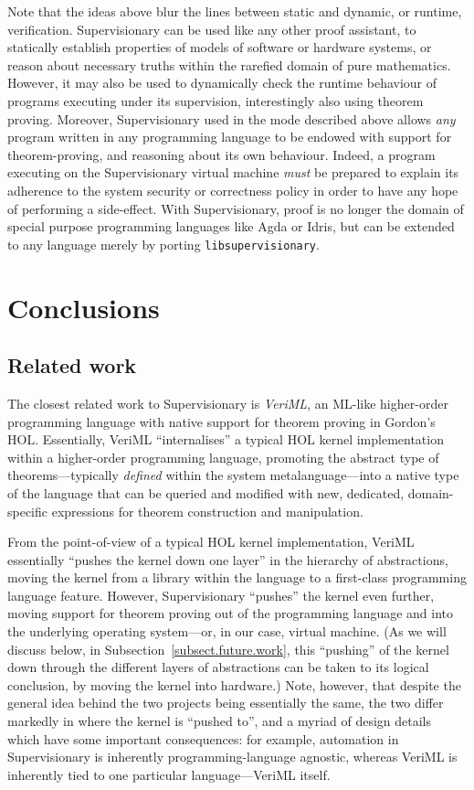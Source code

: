 \documentclass[a4paper, UKenglish, cleveref, autoref, thm-restate, colorlinks]{lipics-v2021}
\begin{document}
Note that the ideas above blur the lines between static and dynamic, or runtime, verification.
Supervisionary can be used like any other proof assistant, to statically establish properties of models of software or hardware systems, or reason about necessary truths within the rarefied domain of pure mathematics.
However, it may also be used to dynamically check the runtime behaviour of programs executing under its supervision, interestingly also using theorem proving.
Moreover, Supervisionary used in the mode described above allows \emph{any} program written in any programming language to be endowed with support for theorem-proving, and reasoning about its own behaviour.
Indeed, a program executing on the Supervisionary virtual machine \emph{must} be prepared to explain its adherence to the system security or correctness policy in order to have any hope of performing a side-effect.
With Supervisionary, proof is no longer the domain of special purpose programming languages like Agda or Idris, but can be extended to any language merely by porting \texttt{libsupervisionary}.

\section{Conclusions}
\label{sect.conclusions}

\subsection{Related work}

The closest related work to Supervisionary is \emph{VeriML}, an ML-like higher-order programming language with native support for theorem proving in Gordon's HOL.
Essentially, VeriML ``internalises'' a typical HOL kernel implementation within a higher-order programming language, promoting the abstract type of theorems---typically \emph{defined} within the system metalanguage---into a native type of the language that can be queried and modified with new, dedicated, domain-specific expressions for theorem construction and manipulation.

From the point-of-view of a typical HOL kernel implementation, VeriML essentially ``pushes the kernel down one layer'' in the hierarchy of abstractions, moving the kernel from a library within the language to a first-class programming language feature.
However, Supervisionary ``pushes'' the kernel even further, moving support for theorem proving out of the programming language and into the underlying operating system---or, in our case, virtual machine.
(As we will discuss below, in Subsection~\ref{subsect.future.work}, this ``pushing'' of the kernel down through the different layers of abstractions can be taken to its logical conclusion, by moving the kernel into hardware.)
Note, however, that despite the general idea behind the two projects being essentially the same, the two differ markedly in where the kernel is ``pushed to'', and a myriad of design details which have some important consequences: for example, automation in Supervisionary is inherently programming-language agnostic, whereas VeriML is inherently tied to one particular language---VeriML itself.
\end{document}

